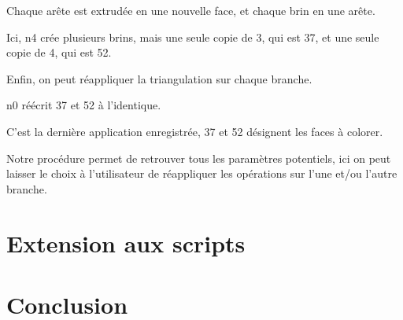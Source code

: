 \documentclass[a4paper]{article}
\begin{document}
Chaque arête est extrudée en une nouvelle face, et chaque brin en une
arête.

Ici, n4 crée plusieurs brins, mais une seule copie de 3, qui est 37, et une seule
copie de 4, qui est 52.






Enfin, on peut réappliquer la triangulation sur chaque branche.

n0 réécrit 37 et 52 à l'identique.

C'est la dernière application enregistrée, 37 et 52 désignent les faces à colorer.

Notre procédure permet de retrouver tous les paramètres potentiels, ici on peut laisser le choix à l'utilisateur de réappliquer les opérations sur l'une et/ou l'autre branche. %

\section{Extension aux scripts}

\section{Conclusion}
\end{document}
